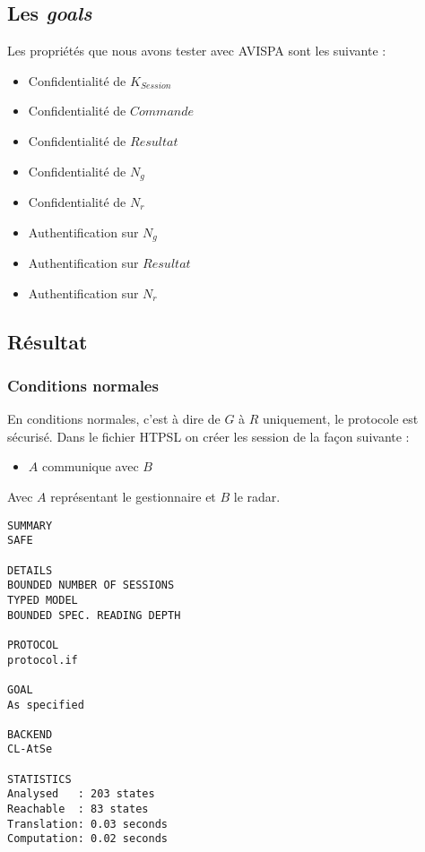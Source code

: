 \documentclass[]{scrartcl}
\begin{document}
\subsection{Les \textit{goals}}

Les propriétés que nous avons tester avec AVISPA sont les suivante : 
\begin{itemize}
	\item Confidentialité de $K_{Session}$
	\item Confidentialité de $Commande$
	\item Confidentialité de $Resultat$
	\item Confidentialité de $N_{g}$
	\item Confidentialité de $N_{r}$
	\item Authentification sur $N_{g}$
	\item Authentification sur $Resultat$
	\item Authentification sur $N_{r}$
	
\end{itemize}

\subsection{Résultat}

\subsubsection{Conditions normales}

En conditions normales, c'est à dire de $G$ à $R$ uniquement, le protocole est sécurisé. Dans le fichier HTPSL on créer les session de la façon suivante :
\begin{itemize}
	\item $A$ communique avec $B$
\end{itemize}
Avec $A$ représentant le gestionnaire et $B$ le radar.
\begin{lstlisting}[caption=Résultat d'éxécution - Conditions normales ]
SUMMARY
SAFE

DETAILS
BOUNDED NUMBER OF SESSIONS
TYPED MODEL
BOUNDED SPEC. READING DEPTH

PROTOCOL
protocol.if

GOAL
As specified

BACKEND
CL-AtSe

STATISTICS
Analysed   : 203 states
Reachable  : 83 states
Translation: 0.03 seconds
Computation: 0.02 seconds
\end{lstlisting}
\end{document}
